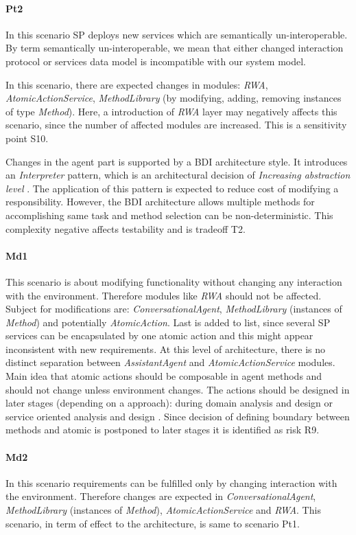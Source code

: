 \documentclass{llncs}
\begin{document}
\paragraph{Pt2} In this scenario \gls{SP} deploys new services which are semantically un-interoperable. By term semantically un-interoperable, we mean that either changed interaction protocol or services data model is incompatible with our system model. 

In this scenario, there are expected changes in modules: \emph{RWA}, \emph{AtomicActionService}, \emph{MethodLibrary} (by modifying, adding, removing instances of type \emph{Method}). Here, a introduction of \emph{RWA} layer may negatively affects this scenario, since the number of affected modules are increased. This is a sensitivity point S10.

Changes in the agent part is supported by a \gls{BDI} architecture style. It introduces an \emph{Interpreter} pattern, which is an architectural decision of \emph{Increasing abstraction level} \cite{bachmann2007modifiability}. The application of this pattern is expected to reduce cost of modifying a responsibility. However, the \gls{BDI} architecture allows multiple methods for accomplishing same task and method selection can be non-deterministic. This complexity negative affects testability and is tradeoff T2.
\paragraph{Md1} This scenario is about modifying functionality without changing any interaction with the environment. Therefore modules like \emph{RWA} should not be affected. Subject for modifications are: \emph{ConversationalAgent}, \emph{MethodLibrary} (instances of \emph{Method}) and potentially \emph{AtomicAction}. Last is added to list, since several \gls{SP} services can be encapsulated by one atomic action and this might appear inconsistent with new requirements. At this level of architecture, there is no distinct separation between \emph{AssistantAgent} and \emph{AtomicActionService} modules. Main idea that atomic actions should be composable in agent methods and should not change unless environment changes. The actions should be designed in later stages (depending on a approach): during domain analysis and design or service oriented analysis and design \cite{ErlSoa2016}. Since decision of defining boundary between methods and atomic is postponed to later stages it is identified as risk R9.
\paragraph{Md2} In this scenario requirements can be fulfilled only by changing interaction with the environment. Therefore changes are expected in  \emph{ConversationalAgent}, \emph{MethodLibrary} (instances of \emph{Method}), \emph{AtomicActionService} and \emph{RWA}. This scenario, in term of effect to the architecture, is same to scenario Pt1.
\end{document}
